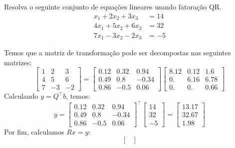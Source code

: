 \begin{question}
  Resolva o seguinte conjunto de equações lineares usando fatoração QR.
  \begin{align*}
    x_1 + 2 x_2 + 3 x_3 & = 14 \\
    4x_1 + 5x_2 + 6x_3  & = 32 \\
    7x_1 - 3x_2 -2x_3   & = -5
  \end{align*}
\end{question}

\begin{resolution}
  Temos que a matriz de transformação pode ser decompostas nas seguintes matrizes:
  $$\begin{bmatrix}
      1 & 2 & 3 \\ 4 & 5 & 6 \\ 7 & -3 & -2
    \end{bmatrix} = \begin{bmatrix}
      0.12 & 0.32 & 0.94  \\
      0.49 & 0.8  & -0.34 \\
      0.86 & -0.5 & 0.06
    \end{bmatrix}
    \begin{bmatrix}
      8.12 & 0.12 & 1.6  \\
      0.   & 6.16 & 6.78 \\
      0.   & 0.   & 0.66
    \end{bmatrix}$$
  Calculando $y = Q^{\top}b$, temos:
  \begin{equation*}
    y = \begin{bmatrix}
      0.12 & 0.32 & 0.94  \\
      0.49 & 0.8  & -0.34 \\
      0.86 & -0.5 & 0.06
    \end{bmatrix} ^{\top} \begin{bmatrix}
      14 \\ 32 \\ -5
    \end{bmatrix} = \begin{bmatrix}
      13.17 \\
      32.67 \\
      1.98
    \end{bmatrix}
  \end{equation*}
  Por fim, calculamos $Rx = y$:
  \begin{equation*}
    \begin{bmatrix}

\end{bmatrix}
\end{equation*}
\end{resolution}
